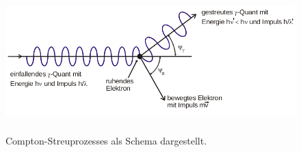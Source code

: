  \begin{figure}
   \centering
   \includegraphics[height=5.5cm]{content/pictures/Compton.png}
   \caption{Compton-Streuprozesses als Schema dargestellt.\cite{V18}}
   \label{fig:Compton}
 \end{figure}

